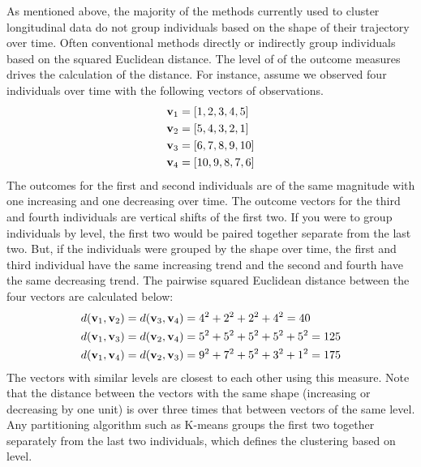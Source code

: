 As mentioned above, the majority of the methods currently used to cluster longitudinal data do not group individuals based on the shape of their trajectory over time. Often conventional methods directly or indirectly group individuals based on the squared Euclidean distance. The level of of the outcome measures drives the calculation of the distance. For instance, assume we observed four individuals over time with the following vectors of observations.
\begin{align*}
\mathbf v_{1}&=[1,2,3,4,5]\\
\mathbf v_{2}&=[5,4,3,2,1]\\
\mathbf v_{3}&=[6,7,8,9,10]\\
\mathbf v_{4}&=[10,9,8,7,6]
\end{align*}
The outcomes for the first and second individuals are of the same magnitude with one increasing and one decreasing over time. The outcome vectors for the third and fourth individuals are vertical shifts of the first two. If you were to group individuals by level, the first two would be paired together separate from the last two. But, if the individuals were grouped by the shape over time, the first and third individual have the same increasing trend and the second and fourth have the same decreasing trend. The pairwise squared Euclidean distance between the four vectors are calculated below:
\begin{align*}
d(\mathbf v_{1},\mathbf v_{2}) = d(\mathbf v_{3},\mathbf v_{4}) &= 4^{2}+2^{2}+2^{2}+4^{2} = 40\\
d(\mathbf v_{1},\mathbf v_{3}) = d(\mathbf v_{2},\mathbf v_{4}) &= 5^{2}+5^{2}+5^{2}+5^{2}+5^{2}=125\\
d(\mathbf v_{1},\mathbf v_{4}) = d(\mathbf v_{2},\mathbf v_{3}) &= 9^{2}+7^{2}+5^{2}+3^{2}+1^{2}=175
\end{align*}
The vectors with similar levels are closest to each other using this measure. Note that the distance between the vectors with the same shape (increasing or decreasing by one unit) is over three times that between vectors of the same level. Any partitioning algorithm such as K-means groups the first two together separately from the last two individuals, which defines the clustering based on level. 

